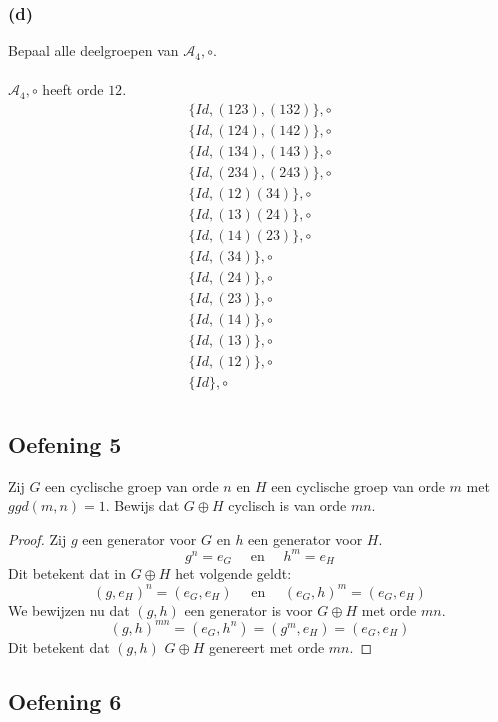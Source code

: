 \documentclass[main.tex]{subfiles}
\begin{document}
\subsubsection*{(d)}
Bepaal alle deelgroepen van $\mathcal{A}_{4},\circ$.\\\\
$\mathcal{A}_{4},\circ$ heeft orde $12$.
\[
\begin{array}{c}
  \{ Id, (123), (132) \},\circ\\
  \{ Id, (124), (142) \},\circ\\
  \{ Id, (134), (143) \},\circ\\
  \{ Id, (234), (243) \},\circ\\
  \{ Id, (12)(34) \},\circ\\
  \{ Id, (13)(24) \},\circ\\
  \{ Id, (14)(23) \},\circ\\
  \{ Id, (34) \},\circ\\
  \{ Id, (24) \},\circ\\
  \{ Id, (23) \},\circ\\
  \{ Id, (14) \},\circ\\
  \{ Id, (13) \},\circ\\
  \{ Id, (12) \},\circ\\
  \{ Id \},\circ\\
\end{array}
\]

\subsection*{Oefening 5}
\label{oza:oz1-oef5}

Zij $G$ een cyclische groep van orde $n$ en $H$ een cyclische groep van orde $m$ met $ggd(m,n)=1$.
Bewijs dat $G \oplus H$ cyclisch is van orde $mn$.

\begin{proof}
  Zij $g$ een generator voor $G$ en $h$ een generator voor $H$.
  \[ g^{n} = e_{G} \quad\text{ en }\quad h^{m} = e_{H} \]
  Dit betekent dat in $G \oplus H$ het volgende geldt:
  \[ (g,e_{H})^{n} = (e_{G},e_{H}) \quad\text{ en }\quad (e_{G},h)^{m} = (e_{G},e_{H}) \]
  We bewijzen nu dat $(g,h)$ een generator is voor $G \oplus H$ met orde $mn$.
  \[ (g,h)^{mn} = (e_{G},h^{n}) = (g^{m},e_{H}) = (e_{G},e_{H}) \]
  Dit betekent dat $(g,h)$ $G \oplus H$ genereert met orde $mn$.
\end{proof}

\subsection*{Oefening 6}
\label{oza:oz1-oef6}
\end{document}
